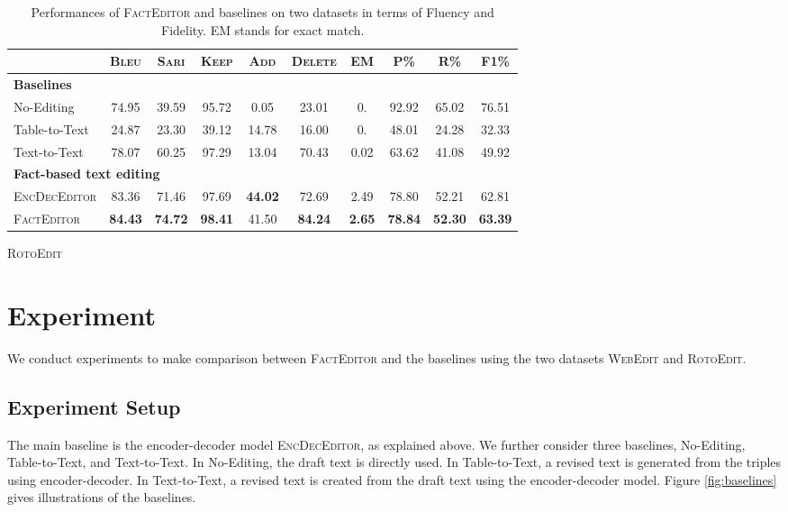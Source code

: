 \documentclass[11pt,a4paper]{article}
\begin{document}
\begin{table*}[t]
\begin{subtable}[t]{\textwidth}
\begin{tabular}{l|c|cccc|c|ccc}
            &\textsc{Bleu} & \textsc{Sari} & \textsc{Keep} & \textsc{Add} & \textsc{Delete} & \textsc{EM} & P\% & R\% & F1\%\\
            \midrule
            \multicolumn{10}{l}{\textbf{Baselines}}\\
            No-Editing              & 74.95 & 39.59 & 95.72 & 0.05 & 23.01 & 0. & 92.92 & 65.02 & 76.51\\
            Table-to-Text      & 24.87 & 23.30 & 39.12 & 14.78 & 16.00 & 0. & 48.01 & 24.28 & 32.33 \\
            Text-to-Text       & 78.07 & 60.25 & 97.29 & 13.04 & 70.43 & 0.02 & 63.62 & 41.08 & 49.92\\
            \midrule
            \multicolumn{10}{l}{\textbf{Fact-based text editing}}\\
            \textsc{EncDecEditor} & 83.36 & 71.46 & 97.69 & \textbf{44.02} & 72.69 & 2.49 & 78.80 & 52.21 & 62.81\\
            \textsc{FactEditor} & \textbf{84.43} & \textbf{74.72} & \textbf{98.41} & 41.50 & \textbf{84.24} & \textbf{2.65} & \textbf{78.84} & \textbf{52.30} & \textbf{63.39}\\
            \bottomrule
        \end{tabular}
        \caption{\textsc{RotoEdit}}
        \label{tab:Experiment_rotoedit}
    \end{subtable}
    \caption{Performances of \textsc{FactEditor} and baselines on two datasets in terms of Fluency and Fidelity. \textsc{EM} stands for exact match.}
    \label{tab:main_results}
\end{table*}

\section{Experiment}

We conduct experiments to make comparison between \textsc{FactEditor} and the baselines using the two datasets \textsc{WebEdit} and \textsc{RotoEdit}.

\subsection{Experiment Setup}

The main baseline is the encoder-decoder model \textsc{EncDecEditor}, as explained above. We further consider three baselines, No-Editing, Table-to-Text, and Text-to-Text. In No-Editing, the draft text is directly used.
In Table-to-Text, a revised text is generated from the triples using encoder-decoder. In Text-to-Text, a revised text is created from the draft text using the encoder-decoder model.
Figure \ref{fig:baselines} gives illustrations of the baselines.
\end{document}
